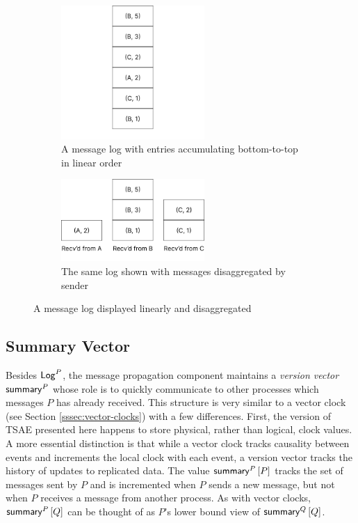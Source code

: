 \documentclass[]             %
{NASA}                       %
\theoremstyle{definition}
\begin{document}
\begin{figure}
  \setlength\belowcaptionskip{5ex}
  \begin{subfigure}{1\textwidth}
    \centering
    \includegraphics[width=0.6\textwidth]{images/MessageLog1.png}
    \caption{A message log with entries accumulating bottom-to-top in linear order}
    \label{fig:message-log-a}
  \end{subfigure}
  \begin{subfigure}{1\textwidth}
    \centering
    \includegraphics[width=0.6\textwidth]{images/MessageLog2.png}
    \caption{The same log shown with messages disaggregated by sender}
    \label{fig:message-log-b}
  \end{subfigure}
  \caption{A message log displayed linearly and disaggregated}
  \label{fig:message-log}
\end{figure}


\subsection{Summary Vector}
\label{ssec:tsae-summary-vectors}
Besides $\mathsf{Log}^{P}$, the message propagation component maintains a
\emph{version vector} $\mathsf{summary}^{P}$ whose role is to quickly
communicate to other processes which messages $P$ has already
received. This structure is very similar to a vector clock (see
Section \ref{sssec:vector-clocks}) with a few differences. First, the
version of TSAE presented here happens to store physical, rather than
logical, clock values. A more essential distinction is that while a
vector clock tracks causality between events and increments the local
clock with each event, a version vector tracks the history of updates
to replicated data. The value $\mathsf{summary}^{P}\left[P\right]$ tracks the set of
messages sent by $P$ and is incremented when $P$ sends a new message,
but not when $P$ receives a message from another process. As with
vector clocks, $\mathsf{summary}^{P}\left[Q\right]$ can be thought of as $P$'s lower bound
view of $\mathsf{summary}^{Q}\left[Q\right]$.
\end{document}
